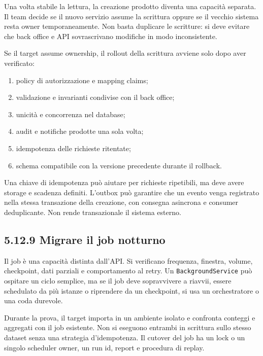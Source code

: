 \documentclass[
  italian,
  10pt,
]{book}
\providecommand{\tightlist}{%
  \setlength{\itemsep}{0pt}\setlength{\parskip}{0pt}}
\begin{document}
Una volta stabile la lettura, la creazione prodotto diventa una capacità
separata. Il team decide se il nuovo servizio assume la scrittura oppure
se il vecchio sistema resta owner temporaneamente. Non basta duplicare
le scritture: si deve evitare che back office e API sovrascrivano
modifiche in modo inconsistente.

Se il target assume ownership, il rollout della scrittura avviene solo
dopo aver verificato:

\begin{enumerate}
\def\labelenumi{\arabic{enumi}.}
\tightlist
\item
  policy di autorizzazione e mapping claims;
\item
  validazione e invarianti condivise con il back office;
\item
  unicità e concorrenza nel database;
\item
  audit e notifiche prodotte una sola volta;
\item
  idempotenza delle richieste ritentate;
\item
  schema compatibile con la versione precedente durante il rollback.
\end{enumerate}

Una chiave di idempotenza può aiutare per richieste ripetibili, ma deve
avere storage e scadenza definiti. L'outbox può garantire che un evento
venga registrato nella stessa transazione della creazione, con consegna
asincrona e consumer deduplicante. Non rende transazionale il sistema
esterno.

\subsection{5.12.9 Migrare il job
notturno}\label{migrare-il-job-notturno}

Il job è una capacità distinta dall'API. Si verificano frequenza,
finestra, volume, checkpoint, dati parziali e comportamento al retry. Un
\texttt{BackgroundService} può ospitare un ciclo semplice, ma se il job
deve sopravvivere a riavvii, essere schedulato da più istanze o
riprendere da un checkpoint, si usa un orchestratore o una coda
durevole.

Durante la prova, il target importa in un ambiente isolato e confronta
conteggi e aggregati con il job esistente. Non si eseguono entrambi in
scrittura sullo stesso dataset senza una strategia d'idempotenza. Il
cutover del job ha un lock o un singolo scheduler owner, un run id,
report e procedura di replay.
\end{document}
